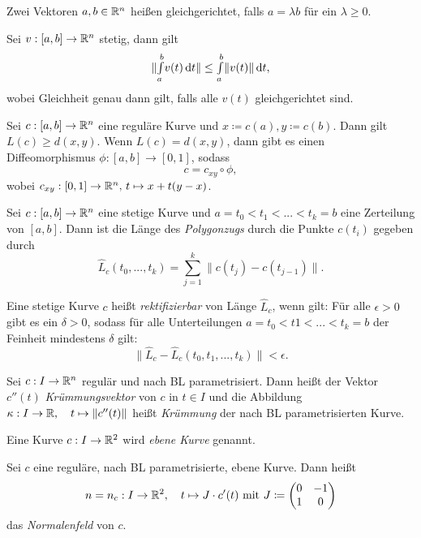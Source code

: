 \documentclass{cheat-sheet}
\newcommand{\Intabdt}[1]{\Int{a}{b}{#1}{t}}
\begin{document}
\begin{defn}
  Zwei Vektoren $a, b \in \mathbb{R}^n$ heißen gleichgerichtet, falls $a = \lambda b$ für ein $\lambda \geq 0$.
\end{defn}

\begin{satz}
  Sei $v : [a, b] \to \mathbb{R}^n$ stetig, dann gilt
  \[ \| \Intabdt{v(t)} \| \leq \Intabdt{\|v(t)\|}, \]
  wobei Gleichheit genau dann gilt, falls alle $v(t)$ gleichgerichtet sind.
\end{satz}

\begin{satz}
  Sei $c : [a, b] \to \mathbb{R}^n$ eine reguläre Kurve und $x \coloneqq c(a), y \coloneqq c(b)$. Dann gilt $L(c) \geq d(x, y)$. Wenn $L(c) = d(x, y)$, dann gibt es einen Diffeomorphismus $\phi : [a, b] \to [0, 1]$, sodass
  \[ c = c_{xy} \circ \phi, \]
  wobei $c_{xy} : [0, 1] \to \mathbb{R}^n,\,t \mapsto x + t (y - x)$.
\end{satz}


\begin{defn}
  Sei $c : [a, b] \to \mathbb{R}^n$ eine stetige Kurve und $a = t_0 < t_1 < ... < t_k = b$ eine Zerteilung von $[a, b]$. Dann ist die Länge des \emph{Polygonzugs} durch die Punkte $c(t_i)$ gegeben durch
  \[ \hat{L}_c(t_0, ..., t_k) = \sum_{j=1}^k \| c(t_j) - c(t_{j-1}) \|. \]
\end{defn}

\begin{defn}
  Eine stetige Kurve $c$ heißt \emph{rektifizierbar} von Länge $\hat{L}_c$, wenn gilt: Für alle $\epsilon > 0$ gibt es ein $\delta > 0$, sodass für alle Unterteilungen $a = t_0 < t1 < ... < t_k = b$ der Feinheit mindestens $\delta$ gilt:
  \[ \| \hat{L}_c - \hat{L}_c(t_0, t_1, ..., t_k) \| < \epsilon. \]
\end{defn}

\begin{defn}
  Sei $c : I \to \mathbb{R}^n$ regulär und nach BL parametrisiert. Dann heißt der Vektor $c''(t)$ \emph{Krümmungsvektor} von $c$ in $t \in I$ und die Abbildung $\kappa : I \to \mathbb{R}, \quad t \mapsto \| c''(t) \|$ heißt \emph{Krümmung} der nach BL parametrisierten Kurve.
\end{defn}

\begin{defn}
  Eine Kurve $c : I \to \mathbb{R}^2$ wird \emph{ebene Kurve} genannt.
\end{defn}

\begin{defn}
  Sei $c$ eine reguläre, nach BL parametrisierte, ebene Kurve. Dann heißt
  \[ n = n_c : I \to \mathbb{R}^2, \quad t \mapsto J \cdot c'(t) \text{ mit } J \coloneqq \begin{pmatrix} 0 & -1 \\ 1 & 0 \end{pmatrix}  \]
  das \emph{Normalenfeld} von $c$.
\end{defn}
\end{document}
